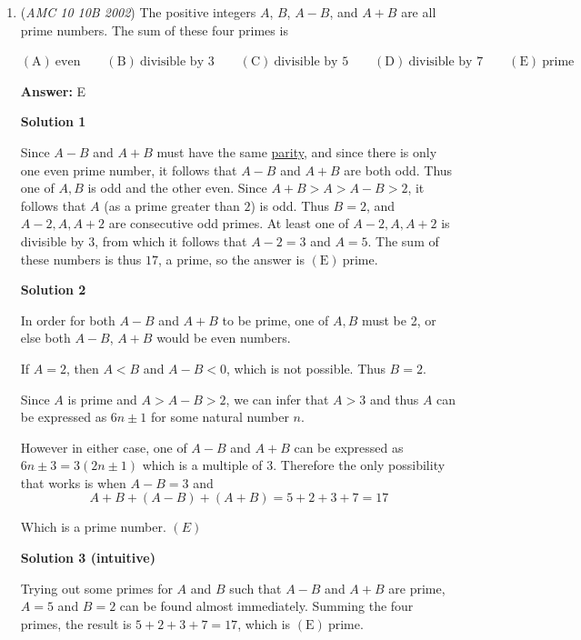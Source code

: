 \begin{enumerate}
	\item (\textit{AMC 10 10B 2002}) The positive integers $A$, $B$, $A-B$, and $A+B$ are all prime numbers. The sum of these four primes is


 $\mathrm{(A) \ } \text{even}\qquad \mathrm{(B) \ } \text{divisible by }3\qquad \mathrm{(C) \ } \text{divisible by }5\qquad \mathrm{(D) \ } \text{divisible by }7\qquad \mathrm{(E) \ } \text{prime}$

 \textbf{Answer: }E



\textbf{Solution 1}

Since $A-B$ and $A+B$ must have the same \href{https://artofproblemsolving.com/wiki/index.php?title=Parity}{parity}, and since there is only one even prime number, it follows that $A-B$ and $A+B$ are both odd. Thus one of $A, B$ is odd and the other even. Since $A+B > A > A-B > 2$, it follows that $A$ (as a prime greater than $2$) is odd. Thus $B = 2$, and $A-2, A, A+2$ are consecutive odd primes. At least one of $A-2, A, A+2$ is divisible by $3$, from which it follows that $A-2 = 3$ and $A = 5$. The sum of these numbers is thus $17$, a prime, so the answer is $\boxed{\mathrm{(E)}\ \text{prime}}$.

 



\textbf{Solution 2}

In order for both $A - B$ and $A + B$ to be prime, one of $A, B$ must be 2, or else both $A - B$, $A + B$ would be even numbers. 

 If $A = 2$, then $A < B$ and $A - B < 0$, which is not possible. Thus $B = 2$.

 Since $A$ is prime and $A > A - B > 2$, we can infer that $A > 3$ and thus $A$ can be expressed as $6n \pm 1$ for some natural number $n$. 

 However in either case, one of $A - B$ and $A + B$ can be expressed as $6n \pm 3 = 3(2n \pm 1)$ which is a multiple of 3. Therefore the only possibility that works is when $A - B = 3$ and 
 \[A + B + (A - B) + (A + B) = 5 + 2 + 3 + 7 = 17\]

 Which is a prime number. $\boxed{(E)}$




\textbf{Solution 3 (intuitive)}

Trying out some primes for $A$ and $B$ such that $A-B$ and $A+B$ are prime, $A=5$ and $B=2$ can be found almost immediately. Summing the four primes, the result is $5+2+3+7=17$, which is $\boxed{\mathrm{(E)}\ \text{prime}}$.


\end{enumerate}
